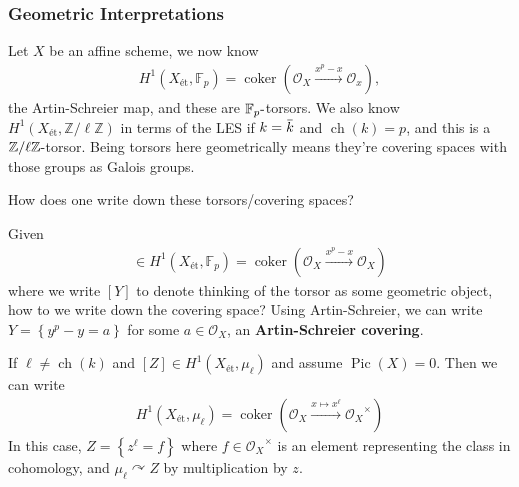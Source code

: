 \hypertarget{geometric-interpretations}{%
\subsubsection{Geometric
Interpretations}\label{geometric-interpretations}}

Let \(X\) be an affine scheme, we now know
\begin{align*}
H^1(X_\text{ét}, {\mathbb{F}}_p) = \operatorname{coker}({\mathcal{O}}_X \xrightarrow{x^p - x} {\mathcal{O}}_x)
,\end{align*}
the Artin-Schreier map, and these are
\({\mathbb{F}}_p{\hbox{-}}\)torsors. We also know
\(H^1(X_\text{ét}, \mathbb{Z}/\ell\mathbb{Z})\) in terms of the LES if
\(k = \mkern 1.5mu\overline{\mkern-1.5muk\mkern-1.5mu}\mkern 1.5mu\) and
\(\operatorname{ch}(k) = p\), and this is a
\(\mathbb{Z}/\ell\mathbb{Z}{\hbox{-}}\)torsor. Being torsors here
geometrically means they're covering spaces with those groups as Galois
groups.

\begin{question}

How does one write down these torsors/covering spaces?

\end{question}

\begin{example}[?]

Given
\begin{align*}
[Y] \in H^1(X_\text{ét}, {\mathbb{F}}_p) = \operatorname{coker}({\mathcal{O}}_X\xrightarrow{x^p-x} {\mathcal{O}}_X)
\end{align*}
where we write \([Y]\) to denote thinking of the torsor as some
geometric object, how to we write down the covering space? Using
Artin-Schreier, we can write \(Y = \left\{{y^p - y = a}\right\}\) for
some \(a\in {\mathcal{O}}_X\), an \textbf{Artin-Schreier covering}.

If \(\ell \neq \operatorname{ch}(k)\) and
\([Z] \in H^1(X_\text{ét}, \mu_\ell)\) and assume
\({\operatorname{Pic}}(X) = 0\). Then we can write
\begin{align*}
H^1(X_\text{ét}, \mu_\ell) = \operatorname{coker}({\mathcal{O}_X}\xrightarrow{x\mapsto x^\ell} {\mathcal{O}_X}^{\times})
\end{align*}
In this case, \(Z = \left\{{z^\ell = f}\right\}\) where
\(f\in {\mathcal{O}_X}^{\times}\) is an element representing the class
in cohomology, and \(\mu_\ell \curvearrowright Z\) by multiplication by
\(z\).

\end{example}

